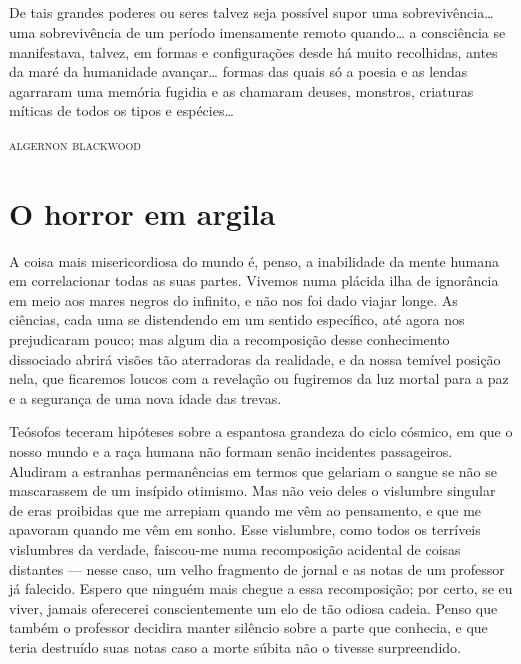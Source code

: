 

\section*{}
\thispagestyle{empty}

\epigraph{De tais grandes poderes ou seres talvez seja possível supor uma
sobrevivência\ldots{} uma sobrevivência de um período imensamente remoto
quando\ldots{} a consciência se manifestava, talvez, em formas e
configurações desde há muito recolhidas, antes da maré da humanidade
avançar\ldots{} formas das quais só a poesia e as lendas agarraram uma
memória fugidia e as chamaram deuses, monstros, criaturas míticas de
todos os tipos e espécies\ldots{}}{\textsc{algernon blackwood}\endnotemark
}



{\let\clearpage\relax\chapter{O horror em argila}}


\noindent{}A coisa mais misericordiosa do mundo é, penso, a inabilidade da mente
humana em correlacionar todas as suas partes. Vivemos numa plácida ilha
de ignorância em meio aos mares negros do infinito, e não nos foi dado
viajar longe. As ciências, cada uma se distendendo em um sentido
específico, até agora nos prejudicaram pouco; mas algum dia a
recomposição desse conhecimento dissociado abrirá visões tão aterradoras
da realidade, e da nossa temível posição nela, que ficaremos loucos com
a revelação ou fugiremos da luz mortal para a paz e a segurança de uma
nova idade das trevas.

Teósofos teceram hipóteses sobre a espantosa grandeza do ciclo cósmico,
em que o nosso mundo e a raça humana não formam senão incidentes
passageiros. Aludiram a estranhas permanências em termos que gelariam o
sangue se não se mascarassem de um insípido otimismo. Mas não veio deles
o vislumbre singular de eras proibidas que me arrepiam quando me vêm ao
pensamento, e que me apavoram quando me vêm em sonho. Esse vislumbre,
como todos os terríveis vislumbres da verdade, faiscou-me numa
recomposição acidental de coisas distantes --- nesse caso, um velho
fragmento de jornal e as notas de um professor já falecido. Espero que
ninguém mais chegue a essa recomposição; por certo, se eu viver, jamais
oferecerei conscientemente um elo de tão odiosa cadeia. Penso que também
o professor decidira manter silêncio sobre a parte que conhecia, e que
teria destruído suas notas caso a morte súbita não o tivesse
surpreendido.


